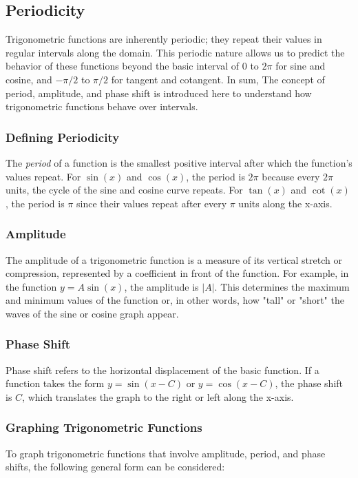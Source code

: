 \documentclass[a4paper,12pt]{book}
\begin{document}
\subsection{Periodicity}
\label{subsec:periodicity}

Trigonometric functions are inherently periodic; they repeat their values in regular intervals along the domain. This periodic nature allows us to predict the behavior of these functions beyond the basic interval of \(0\) to \(2\pi\) for sine and cosine, and \( -\pi/2 \) to \( \pi/2 \) for tangent and cotangent.
In sum, The concept of period, amplitude, and phase shift is introduced here to understand how trigonometric functions behave over intervals.

\subsubsection*{Defining Periodicity}
The \textit{period} of a function is the smallest positive interval after which the function's values repeat. For \( \sin(x) \) and \( \cos(x) \), the period is \(2\pi\) because every \(2\pi\) units, the cycle of the sine and cosine curve repeats. For \( \tan(x) \) and \( \cot(x) \), the period is \( \pi \) since their values repeat after every \( \pi \) units along the x-axis.

\subsubsection*{Amplitude}
The amplitude of a trigonometric function is a measure of its vertical stretch or compression, represented by a coefficient in front of the function. For example, in the function \( y = A\sin(x) \), the amplitude is \( |A| \). This determines the maximum and minimum values of the function or, in other words, how "tall" or "short" the waves of the sine or cosine graph appear.

\subsubsection*{Phase Shift}
Phase shift refers to the horizontal displacement of the basic function. If a function takes the form \( y = \sin(x - C) \) or \( y = \cos(x - C) \), the phase shift is \( C \), which translates the graph to the right or left along the x-axis.

\subsubsection*{Graphing Trigonometric Functions}
To graph trigonometric functions that involve amplitude, period, and phase shifts, the following general form can be considered:
\end{document}
